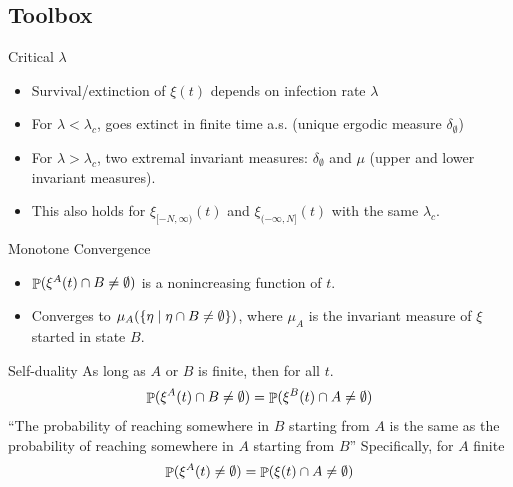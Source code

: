 \documentclass{beamer}
\begin{document}
\subsection{Toolbox}

\begin{frame}{Critical $\lambda$}
  \begin{itemize}
    \item Survival/extinction of $\xi(t)$ depends on infection rate $\lambda$
          \pause
    \item For $\lambda < \lambda_{c}$, goes extinct in finite time a.s. (unique ergodic measure $\delta_{\emptyset}$)
          \pause
    \item For $\lambda > \lambda_{c}$, two extremal invariant measures: $\delta_{\emptyset}$ and $\mu$ (upper and lower invariant measures).
          \pause
    \item This also holds for $\xi_{[-N,\infty)}(t)$ and $\xi_{(-\infty,N]}(t)$ with the same $\lambda_c$.
  \end{itemize}
\end{frame}

\begin{frame}{Monotone Convergence}
  \begin{itemize}
    \item $\mathop{\mathbb{P}}(\xi^{A}(t) \cap B \neq \emptyset)$ is a nonincreasing function of $t$.
      \pause
    \item Converges to $\mu_{A}(\{\eta \mid \eta \cap B \neq \emptyset\})$, where $\mu_{A}$ is the invariant measure of $\xi$ started in state $B$.
  \end{itemize}
\end{frame}

\begin{frame}{Self-duality}
  As long as $A$ or $B$ is finite, then for all $t$.
  \begin{equation}
    \mathop{\mathbb{P}}(\xi^{A}(t) \cap B \neq \emptyset) = \mathop{\mathbb{P}}(\xi^{B}(t) \cap A \neq \emptyset)
  \end{equation}
  \pause
  ``The probability of reaching somewhere in $B$ starting from $A$ is the same as the probability of reaching somewhere in $A$ starting from $B$''
  \pause
  Specifically, for $A$ finite
  \begin{equation}
    \mathop{\mathbb{P}}(\xi^{A}(t) \neq \emptyset) = \mathop{\mathbb{P}}(\xi(t) \cap A \neq \emptyset)
  \end{equation}
\end{frame}
\end{document}
